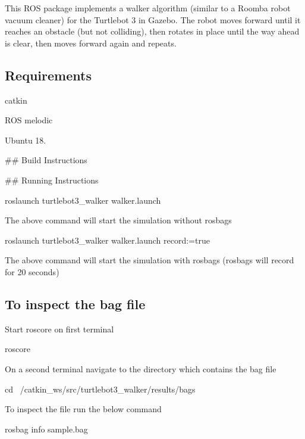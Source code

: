 This R\+OS package implements a walker algorithm (similar to a Roomba robot vacuum cleaner) for the Turtlebot 3 in Gazebo. The robot moves forward until it reaches an obstacle (but not colliding), then rotates in place until the way ahead is clear, then moves forward again and repeats.

\subsection*{Requirements}


\begin{DoxyItemize}
\item catkin
\item R\+OS melodic
\item Ubuntu 18.
\end{DoxyItemize}

\#\# Build Instructions 


\#\# Running Instructions 
\begin{DoxyCode}
roslaunch turtlebot3\_walker walker.launch 
\end{DoxyCode}
 The above command will start the simulation without rosbags 
\begin{DoxyCode}
roslaunch turtlebot3\_walker walker.launch record:=true
\end{DoxyCode}
 The above command will start the simulation with rosbags (rosbags will record for 20 seconds)

\subsection*{To inspect the bag file}

Start roscore on first terminal 
\begin{DoxyCode}
roscore
\end{DoxyCode}
 On a second terminal navigate to the directory which contains the bag file 
\begin{DoxyCode}
cd ~/catkin\_ws/src/turtlebot3\_walker/results/bags
\end{DoxyCode}
 To inspect the file run the below command 
\begin{DoxyCode}
rosbag info sample.bag 
\end{DoxyCode}
 